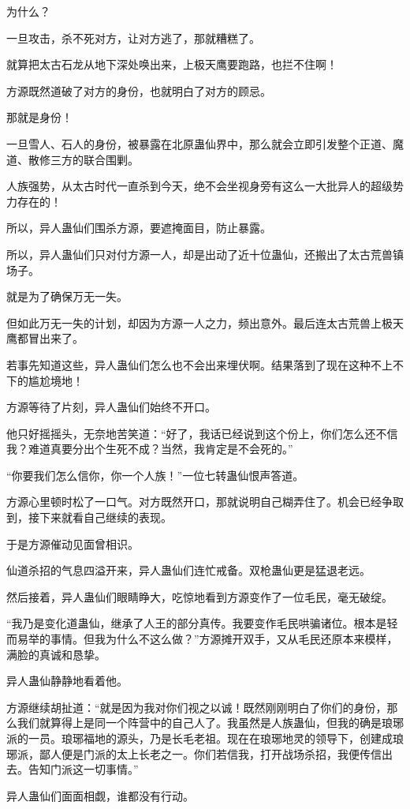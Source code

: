 \begin{this_body}
为什么？

一旦攻击，杀不死对方，让对方逃了，那就糟糕了。

就算把太古石龙从地下深处唤出来，上极天鹰要跑路，也拦不住啊！

方源既然道破了对方的身份，也就明白了对方的顾忌。

那就是身份！

一旦雪人、石人的身份，被暴露在北原蛊仙界中，那么就会立即引发整个正道、魔道、散修三方的联合围剿。

人族强势，从太古时代一直杀到今天，绝不会坐视身旁有这么一大批异人的超级势力存在的！

所以，异人蛊仙们围杀方源，要遮掩面目，防止暴露。

所以，异人蛊仙们只对付方源一人，却是出动了近十位蛊仙，还搬出了太古荒兽镇场子。

就是为了确保万无一失。

但如此万无一失的计划，却因为方源一人之力，频出意外。最后连太古荒兽上极天鹰都冒出来了。

若事先知道这些，异人蛊仙们怎么也不会出来埋伏啊。结果落到了现在这种不上不下的尴尬境地！

方源等待了片刻，异人蛊仙们始终不开口。

他只好摇摇头，无奈地苦笑道：“好了，我话已经说到这个份上，你们怎么还不信我？难道真要分出个生死不成？当然，我肯定是不会死的。”

“你要我们怎么信你，你一个人族！”一位七转蛊仙恨声答道。

方源心里顿时松了一口气。对方既然开口，那就说明自己糊弄住了。机会已经争取到，接下来就看自己继续的表现。

于是方源催动见面曾相识。

仙道杀招的气息四溢开来，异人蛊仙们连忙戒备。双枪蛊仙更是猛退老远。

然后接着，异人蛊仙们眼睛睁大，吃惊地看到方源变作了一位毛民，毫无破绽。

“我乃是变化道蛊仙，继承了人王的部分真传。我要变作毛民哄骗诸位。根本是轻而易举的事情。但我为什么不这么做？”方源摊开双手，又从毛民还原本来模样，满脸的真诚和恳挚。

异人蛊仙静静地看着他。

方源继续胡扯道：“就是因为我对你们视之以诚！既然刚刚明白了你们的身份，那么我们就算得上是同一个阵营中的自己人了。我虽然是人族蛊仙，但我的确是琅琊派的一员。琅琊福地的源头，乃是长毛老祖。现在在琅琊地灵的领导下，创建成琅琊派，鄙人便是门派的太上长老之一。你们若信我，打开战场杀招，我便传信出去。告知门派这一切事情。”

异人蛊仙们面面相觑，谁都没有行动。


\end{this_body}
